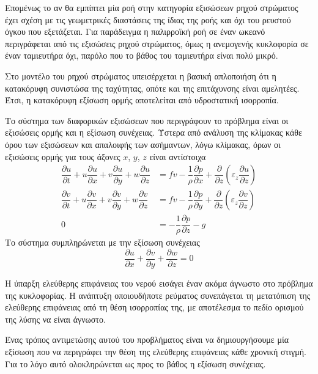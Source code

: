Επομένως το αν θα εμπίπτει μία ροή στην κατηγορία εξισώσεων ρηχού στρώματος έχει σχέση με τις γεωμετρικές διαστάσεις της ίδιας της ροής και όχι του ρευστού όγκου που εξετάζεται. Για παράδειγμα η παλιρροϊκή ροή σε έναν ωκεανό περιγράφεται από τις εξισώσεις ρηχού στρώματος, όμως η ανεμογενής κυκλοφορία σε έναν ταμιευτήρα όχι, παρόλο που το βάθος του ταμιευτήρα είναι πολύ μικρό.

Στο μοντέλο του ρηχού στρώματος υπεισέρχεται η βασική απλοποιήση ότι η κατακόρυφη συνιστώσα της ταχύτητας, οπότε και της επιτάχυνσης είναι αμελητέες. Έτσι, η κατακόρυφη εξίσωση ορμής αποτελείται από υδροστατική ισορροπία.

Το σύστημα των διαφορικών εξισώσεων που περιγράφουν το πρόβλημα είναι οι εξισώσεις ορμής  και η εξίσωση συνέχειας. Ύστερα από ανάλυση της κλίμακας κάθε όρου των εξισώσεων και απαλοιφής των ασήμαντων, λόγω κλίμακας, όρων οι εξισώσεις ορμής για τους άξονες $x$, $y$, $z$ είναι αντίστοιχα
\begin{align}
    \dfrac{\partial{u}}{\partial{t}} + u\dfrac{\partial{u}}{\partial{x}} + v\dfrac{\partial{u}}{\partial{y}} + w\dfrac{\partial{u}}{\partial{z}} &= fv-\dfrac{1}{ρ}\dfrac{\partial{p}}{\partial{x}} + \dfrac{\partial}{\partial{z}}\left(ε_z\dfrac{\partial{u}}{\partial{z}}\right) \\
    \dfrac{\partial{v}}{\partial{t}} + u\dfrac{\partial{v}}{\partial{x}} + v\dfrac{\partial{v}}{\partial{y}} + w\dfrac{\partial{v}}{\partial{z}} &= fv-\dfrac{1}{ρ}\dfrac{\partial{p}}{\partial{y}} + \dfrac{\partial}{\partial{z}}\left(ε_z\dfrac{\partial{v}}{\partial{z}}\right) \\
    0 &= -\dfrac{1}{ρ}\dfrac{\partial{p}}{\partial{z}} - g
\end{align}
Το σύστημα συμπληρώνεται με την εξίσωση συνέχειας
\begin{equation}
    \dfrac{\partial{u}}{\partial{x}} + \dfrac{\partial{v}}{\partial{y}} + \dfrac{\partial{w}}{\partial{z}} = 0
\end{equation}

Η ύπαρξη ελεύθερης επιφάνειας του νερού εισάγει έναν ακόμα άγνωστο στο πρόβλημα της κυκλοφορίας. Η ανάπτυξη οποιουδήποτε ρεύματος συνεπάγεται τη μετατόπιση της ελεύθερης επιφάνειας από τη θέση ισορροπίας της, με αποτέλεσμα το πεδίο ορισμού της λύσης να είναι άγνωστο.

Ένας τρόπος αντιμετώσης αυτού του προβλήματος είναι να δημιουργήσουμε μία εξίσωση που να περιγράφει την θέση της ελεύθερης επιφάνειας κάθε χρονική στιγμή. Για το λόγο αυτό ολοκληρώνεται ως προς το βάθος η εξίσωση συνέχειας.

